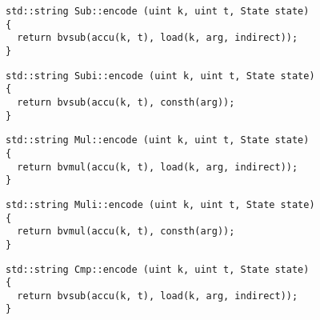 \begin{lstlisting}[style=c++, style=encode]
std::string Sub::encode (uint k, uint t, State state)
{
  return bvsub(accu(k, t), load(k, arg, indirect));
}
\end{lstlisting}


\begin{lstlisting}[style=c++, style=encode]
std::string Subi::encode (uint k, uint t, State state)
{
  return bvsub(accu(k, t), consth(arg));
}
\end{lstlisting}


\newpage

\begin{lstlisting}[style=c++, style=encode]
std::string Mul::encode (uint k, uint t, State state)
{
  return bvmul(accu(k, t), load(k, arg, indirect));
}
\end{lstlisting}


\begin{lstlisting}[style=c++, style=encode]
std::string Muli::encode (uint k, uint t, State state)
{
  return bvmul(accu(k, t), consth(arg));
}
\end{lstlisting}


\begin{lstlisting}[style=c++, style=encode]
std::string Cmp::encode (uint k, uint t, State state)
{
  return bvsub(accu(k, t), load(k, arg, indirect));
}
\end{lstlisting}

